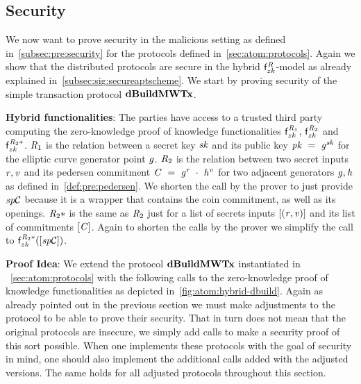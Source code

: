 \subsection{Security}\label{subsec:atom:security}

We now want to prove security in the malicious setting as defined in~\cref{subsec:pre:security} for the protocols defined in~\cref{sec:atom:protocols}.
Again we show that the distributed protocols are secure in the hybrid $\mathsf{f}^{\mathit{R}}_{zk}$-model as already explained in~\cref{subsec:sig:secureaptscheme}.
We start by proving security of the simple transaction protocol $\mathbf{dBuildMWTx}$.

\textbf{Hybrid functionalities}: The parties have access to a trusted third party computing the zero-knowledge proof of knowledge functionalities $\mathsf{f}^{\mathit{R}_1}_{zk}$, $\mathsf{f}^{\mathit{R}_2}_{zk}$ and $\mathsf{f}^{\mathit{R}_2*}_{zk}$.
$\mathit{R}_1$ is the relation between a secret key $\mathit{sk}$ and its public key $\mathit{pk} ~=~ \mathit{g}^{\mathit{sk}}$ for the elliptic curve generator point $\mathit{g}$.
$\mathit{R}_2$ is the relation between two secret inputs $\mathit{r}, \mathit{v}$ and its pedersen commitment $\mathit{C} ~=~ \mathit{g}^{\mathit{r}} ~\cdot~ \mathit{h}^{\mathit{v}}$ for two adjacent generators $\mathit{g}, \mathit{h}$ as defined in~\cref{def:pre:pedersen}.
We shorten the call by the prover to just provide $\mathit{sp}\mathcal{C}$ because it is a wrapper that contains the coin commitment, as well as its openings.
$\mathit{R}_2*$ is the same as $\mathit{R}_2$ just for a list of secrets inputs $[(\mathit{r}, \mathit{v})]$ and its list of commitments $[\mathit{C}]$.
Again to shorten the calls by the prover we simplify the call to $\mathsf{f}^{\mathit{R}_2*}_{zk}([\mathit{sp}\mathcal{C}])$.

\textbf{Proof Idea}: We extend the protocol $\mathbf{dBuildMWTx}$ instantiated in ~\cref{sec:atom:protocols} with the following calls to the zero-knowledge proof of knowledge functionalities as depicted in~\cref{fig:atom:hybrid-dbuild}.
Again as already pointed out in the previous section we must make adjustments to the protocol to be able to prove their security.
That in turn does not mean that the original protocols are insecure, we simply add calls to make a security proof of this sort possible.
When one implements these protocols with the goal of security in mind, one should also implement the additional calls added with the adjusted versions.
The same holds for all adjusted protocols throughout this section.

